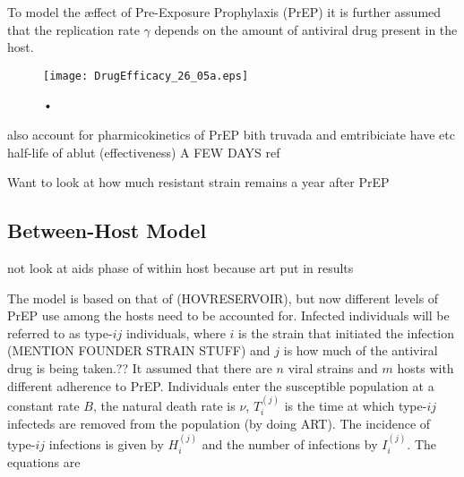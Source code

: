 \documentclass[DIV=15]{scrartcl}
\begin{document}
To model the {\ae}ffect of Pre-Exposure Prophylaxis (PrEP) it is further assumed that the replication rate $\gamma$ depends on the amount of antiviral drug present in the host.

\fi




\begin{figure}[h]
 \begin{center}
 \texttt{[image: DrugEfficacy\_26\_05a.eps]}
 \end{center}
 \caption{•}
 \label{Drug efficacy}
 \end{figure}
 
also account for pharmicokinetics of PrEP bith truvada and emtribiciate have etc half-life of ablut (effectiveness) A  FEW DAYS ref



Want to look  at how much resistant strain remains a year after PrEP


\iffalse
pictures made on  26/05 max values occur at (for strain 1 initial) a=0.01, rL=2 in the active compartment

for the reservoir max occurs at a=1.25e-4 and rL=0.55

now for homeostatic proliferation  the max value in the reservoir is when rho = 0 (just great!) and rL=1.6

in the active compartment it  is rL=1.375 and rho=0.009
\fi


\fi





\subsection{Between-Host Model}




not look  at aids  phase of within host because art put  in results 





The model is based on that of (HOVRESERVOIR), but now different levels of PrEP use  among the hosts need to be accounted for. Infected individuals will be referred to as type-$ij$ individuals, where $i$ is the strain that initiated the infection (MENTION FOUNDER STRAIN STUFF)  and $j$ is how much of the antiviral drug is being taken.?? It assumed that there are $  n$ viral strains and $m$ hosts with different adherence to PrEP. 
 Individuals enter the susceptible population
at a constant rate $B$, the natural death rate is $\nu$, $T_i^{(j)}$ is  the time at which type-$ij$ infecteds are removed from the population (by doing ART). The incidence  of  type-$ij$ infections is given by $H_i^{(j)}$ and the number of infections by 
$I_i^{(j)}$. The equations are
\end{document}
